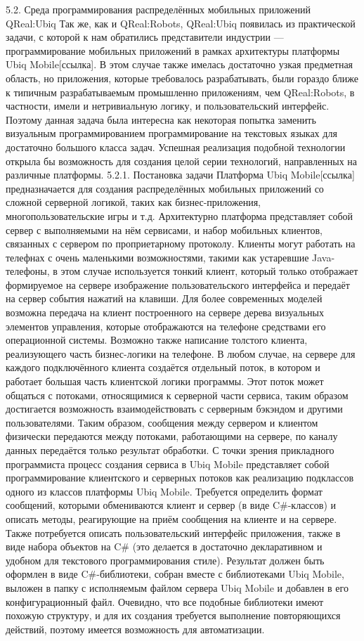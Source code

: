 5.2. Среда программирования распределённых мобильных приложений QReal:Ubiq
	Так же, как и QReal:Robots, QReal:Ubiq появилась из практической задачи, с которой к нам обратились представители индустрии --- программирование мобильных приложений в рамках архитектуры платформы Ubiq Mobile[ссылка]. В этом случае также имелась достаточно узкая предметная область, но приложения, которые требовалось разрабатывать, были гораздо ближе к типичным разрабатываемым промышленно приложениям, чем QReal:Robots, в частности, имели и нетривиальную логику, и пользовательский интерфейс. Поэтому данная задача была интересна как некоторая попытка заменить визуальным программированием программирование на текстовых языках для достаточно большого класса задач. Успешная реализация подобной технологии открыла бы возможность для создания целой серии технологий, направленных на различные платформы.
5.2.1. Постановка задачи
	Платформа Ubiq Mobile[ссылка] предназначается для создания распределённых мобильных приложений со сложной серверной логикой, таких как бизнес-приложения, многопользовательские игры и т.д. Архитектурно платформа представляет собой сервер с выполняемыми на нём сервисами, и набор мобильных клиентов, связанных с сервером по проприетарному протоколу. Клиенты могут работать на телефнах с очень маленькими возможностями, такими как устаревшие Java-телефоны, в этом случае используется тонкий клиент, который только отображает формируемое на сервере изображение пользовательского интерфейса и передаёт на сервер события нажатий на клавиши. Для более современных моделей возможна передача на клиент построенного на сервере дерева визуальных элементов управления, которые отображаются на телефоне средствами его операционной системы. Возможно также написание толстого клиента, реализующего часть бизнес-логики на телефоне. В любом случае, на сервере для каждого подключённого клиента создаётся отдельный поток, в котором и работает большая часть клиентской логики программы. Этот поток может общаться с потоками, относящимися к серверной части сервиса, таким образом достигается возможность взаимодействовать с серверным бэкэндом и другими пользователями. Таким образом, сообщения между сервером и клиентом физически передаются между потоками, работающими на сервере, по каналу данных передаётся только результат обработки.
	С точки зрения прикладного программиста процесс создания сервиса в Ubiq Mobile представляет собой программирование клиентского и серверных потоков как реализацию подклассов одного из классов платформы Ubiq Mobile. Требуется определить формат сообщений, которыми обмениваются клиент и сервер (в виде C#-классов) и описать методы, реагирующие на приём сообщения на клиенте и на сервере. Также потребуется описать пользовательский интерфейс приложения, также в виде набора объектов на C# (это делается в достаточно декларативном и удобном для текстового программирования стиле). Результат должен быть оформлен в виде C#-библиотеки, собран вместе с библиотеками Ubiq Mobile, выложен в папку с исполняемым файлом сервера Ubiq Mobile и добавлен в его конфигурационный файл. Очевидно, что все подобные библиотеки имеют похожую структуру, и для их создания требуется выполнение повторяющихся действий, поэтому имеется возможность для автоматизации.
